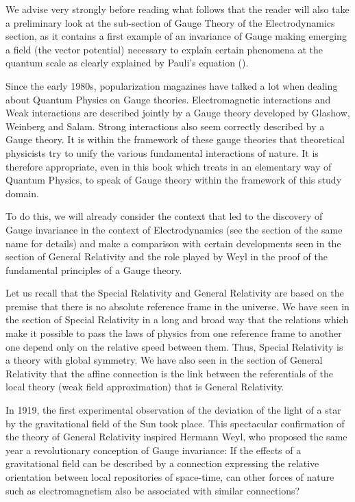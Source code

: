 	We advise very strongly before reading what follows that the reader will also take a preliminary look at the sub-section of Gauge Theory of the Electrodynamics section, as it contains a first example of an invariance of Gauge making emerging a field (the vector potential) necessary to explain certain phenomena at the quantum scale as clearly explained by Pauli's equation ().

	Since the early 1980s, popularization magazines have talked a lot when dealing about Quantum Physics on Gauge theories. Electromagnetic interactions and Weak interactions are described jointly by a Gauge theory developed by Glashow, Weinberg and Salam. Strong interactions also seem correctly described by a Gauge theory. It is within the framework of these gauge theories that theoretical physicists try to unify the various fundamental interactions of nature. It is therefore appropriate, even in this book which treats in an elementary way of Quantum Physics, to speak of Gauge theory within the framework of this study domain.
	
	To do this, we will already consider the context that led to the discovery of Gauge invariance in the context of Electrodynamics (see the section of the same name for details) and make a comparison with certain developments seen in the section of General Relativity and the role played by Weyl in the proof of the fundamental principles of a Gauge theory.

	Let us recall that the Special Relativity and General Relativity are based on the premise that there is no absolute reference frame in the universe. We have seen in the section of Special Relativity in a long and broad way that the relations which make it possible to pass the laws of physics from one reference frame to another one depend only on the relative speed between them. Thus, Special Relativity is a theory with global symmetry. We have also seen in the section of General Relativity that the affine connection is the link between the referentials of the local theory (weak field approximation) that is General Relativity.
	
	In 1919, the first experimental observation of the deviation of the light of a star by the gravitational field of the Sun took place. This spectacular confirmation of the theory of General Relativity inspired Hermann Weyl, who proposed the same year a revolutionary conception of Gauge invariance: If the effects of a gravitational field can be described by a connection expressing the relative orientation between local repositories of space-time, can other forces of nature such as electromagnetism also be associated with similar connections?

